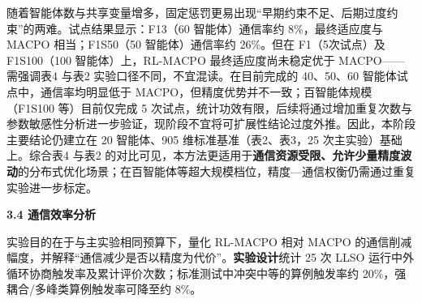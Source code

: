 ~~\\~~\\
~~\\
~~\\
~~\\
\par{}


\par
\indent
\par
随着智能体数与共享变量增多，固定惩罚更易出现“早期约束不足、后期过度约束”的两难。试点结果显示：F13（60 智能体）通信率约 8\%，最终适应度与 MACPO 相当；F1S50（50 智能体）通信率约 26\%。但在 F1（5次试点）及 F1S100（100 智能体）上，RL-MACPO 最终适应度尚未稳定优于 MACPO——需强调表4 与表2 实验口径不同，不宜混读。在目前完成的 40、50、60 智能体试点中，通信率均明显低于 MACPO，但精度优势并不一致；百智能体规模（F1S100 等）目前仅完成 5 次试点，统计功效有限，后续将通过增加重复次数与参数敏感性分析进一步验证，现阶段不宜将可扩展性结论过度外推。因此，本阶段主要结论仍建立在 20 智能体、905 维标准基准（表2、表3，25 次主实验）基础上。综合表4 与表2 的对比可见，本方法更适用于\textbf{通信资源受限、允许少量精度波动}的分布式优化场景；在百智能体等超大规模档位，精度—通信权衡仍需通过重复实验进一步标定。

\par
\indent
\textbf{3.4 通信效率分析}
\par
\par
实验目的在于与主实验相同预算下，量化 RL-MACPO 相对 MACPO 的通信削减幅度，并解释“通信减少是否以精度为代价”。\textbf{实验设计}统计 25 次 LLSO 运行中外循环协商触发率及累计评价次数；标准测试中冲突中等的算例触发率约 20\%，强耦合/多峰类算例触发率可降至约 8\%。


